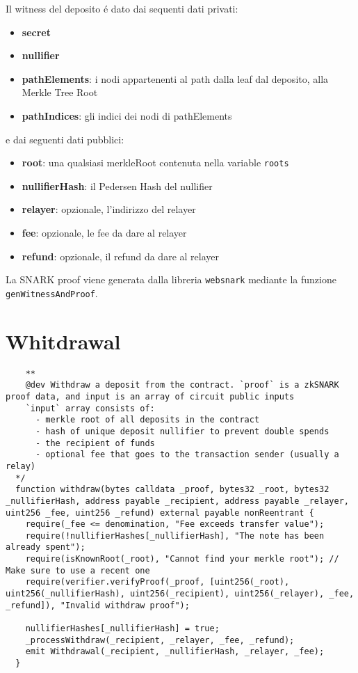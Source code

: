 Il witness del deposito é dato dai sequenti dati privati:

\begin{itemize}
    \item \textbf{secret}
    \item \textbf{nullifier} 
    \item \textbf{pathElements}: i nodi appartenenti al path dalla leaf dal deposito, alla Merkle Tree Root
    \item \textbf{pathIndices}: gli indici dei nodi di pathElements
\end{itemize}

e dai seguenti dati pubblici:

\begin{itemize}
    \item \textbf{root}: una qualsiasi merkleRoot contenuta nella variable \verb|roots|
    \item \textbf{nullifierHash}: il Pedersen Hash del nullifier
    \item \textbf{relayer}: opzionale, l'indirizzo del relayer
    \item \textbf{fee}: opzionale, le fee da dare al relayer
    \item \textbf{refund}: opzionale, il refund da dare al relayer
\end{itemize}

La SNARK proof viene generata dalla libreria \verb|websnark| mediante la funzione \verb|genWitnessAndProof|.

\section{Whitdrawal}

\begin{lstlisting}
    **
    @dev Withdraw a deposit from the contract. `proof` is a zkSNARK proof data, and input is an array of circuit public inputs
    `input` array consists of:
      - merkle root of all deposits in the contract
      - hash of unique deposit nullifier to prevent double spends
      - the recipient of funds
      - optional fee that goes to the transaction sender (usually a relay)
  */
  function withdraw(bytes calldata _proof, bytes32 _root, bytes32 _nullifierHash, address payable _recipient, address payable _relayer, uint256 _fee, uint256 _refund) external payable nonReentrant {
    require(_fee <= denomination, "Fee exceeds transfer value");
    require(!nullifierHashes[_nullifierHash], "The note has been already spent");
    require(isKnownRoot(_root), "Cannot find your merkle root"); // Make sure to use a recent one
    require(verifier.verifyProof(_proof, [uint256(_root), uint256(_nullifierHash), uint256(_recipient), uint256(_relayer), _fee, _refund]), "Invalid withdraw proof");

    nullifierHashes[_nullifierHash] = true;
    _processWithdraw(_recipient, _relayer, _fee, _refund);
    emit Withdrawal(_recipient, _nullifierHash, _relayer, _fee);
  }
\end{lstlisting}


